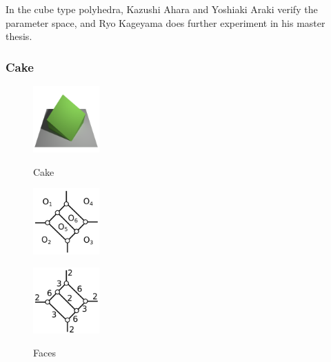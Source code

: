 \documentclass[suppldata, dvipdfmx]{interact}
\theoremstyle{plain}%
\theoremstyle{definition}
\theoremstyle{remark}
\theoremstyle{problemstyle}
\begin{document}
In the cube type polyhedra, Kazushi Ahara and Yoshiaki Araki
verify the parameter space, and Ryo Kageyama does further experiment in
his master thesis\cite{kageyama}. 

\subsubsection{Cake}

\begin{figure}[h!tbp]
  \begin{minipage}[t]{0.16\textwidth}
   \centering
   \includegraphics[width=1in, keepaspectratio]{./img/HexahedraWithSphericalFaces/hexahedralCake/cake.png}
   \caption{Cake}
   \label{fig:cake}
  \end{minipage}
 \hspace*{\fill}
  \begin{minipage}[t]{0.16\textwidth}
   \centering
   \includegraphics[width=1in, keepaspectratio]{./img/HexahedraWithSphericalFaces/hexahedralCake/hexahedralCakeFaces.png}
   \caption{Faces}
   \label{fig:}
  \end{minipage}
 \hspace*{\fill}
 \begin{minipage}[t]{0.6\textwidth}
  \begin{minipage}[t]{0.19\textwidth}
   \centering
   \includegraphics[width=1in,
   keepaspectratio]{./img/HexahedraWithSphericalFaces/hexahedralCake/hexahedralCake_a.png}
   \subcaption{}
   \label{fig:}
  \end{minipage}
  \hspace*{\fill}
  \begin{minipage}[t]{0.19\textwidth}

\end{minipage}
\end{minipage}
\end{figure}
\end{document}
